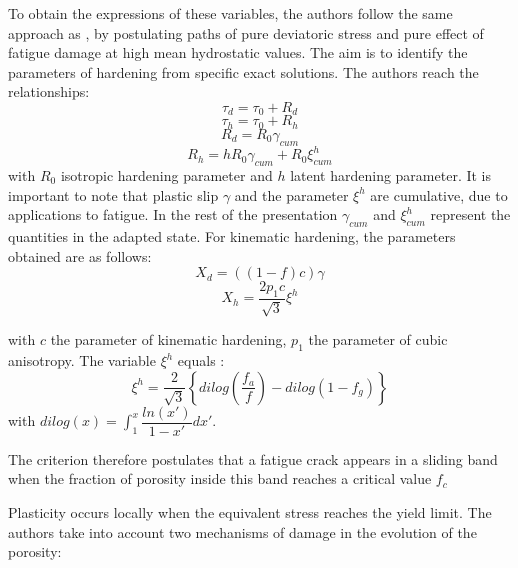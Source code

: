 To obtain the expressions of these variables, the authors follow the same approach as \cite{leblond1995improved}, by postulating paths of pure deviatoric stress and pure effect of fatigue damage at high mean hydrostatic values. The aim is to identify the parameters of hardening from specific exact solutions. The authors reach the relationships:
\begin{equation}\tau_d = \tau_0 + R_d
\label{eq.monchiet10}
\end{equation}
\begin{equation}\tau_h = \tau_0 + R_h
\label{eq.monchiet11}
\end{equation}
\begin{equation}R_d=R_0\gamma_{cum}
\label{eq.monchiet12}
\end{equation}
\begin{equation}R_h=hR_0\gamma_{cum}+R_0\xi_{cum}^h
\label{eq.monchiet13}
\end{equation}
with $R_0$ isotropic hardening parameter and $h$ latent hardening parameter. It is important to note that plastic slip $\gamma$ and the parameter $\xi^h$ are cumulative, due to applications to fatigue. In the rest of the presentation $\gamma_{cum}$ and $\xi_{cum}^h$
represent the quantities in the adapted state. For kinematic hardening, the parameters obtained are as follows:
\begin{equation}
X_d=((1-f)c)\gamma
\label{eq.monchiet14}
\end{equation}
\begin{equation}
X_h=\dfrac{2p_1c}{\sqrt{3}}\xi^h
\label{eq.monchiet15}
\end{equation}

with $c$ the parameter of kinematic hardening, $p_1$ the parameter of cubic anisotropy.
The variable $\xi^h$ equals :
\begin{equation}
\xi^h=\dfrac{2}{\sqrt{3}}\left\lbrace dilog\left(\dfrac{f_a}{f}\right) -dilog\left(1-f_g \right)  \right\rbrace 
\label{eq.monchiet16}
\end{equation}
with $dilog(x)=\int_{1}^{x}\dfrac{ln(x')}{1-x'}dx'$.

The criterion therefore postulates that a fatigue crack appears in a sliding band when the fraction of porosity inside this band reaches a critical value $f_c$

Plasticity occurs locally when the equivalent stress reaches the yield limit. The authors take into account two mechanisms of damage in the evolution of the porosity:

